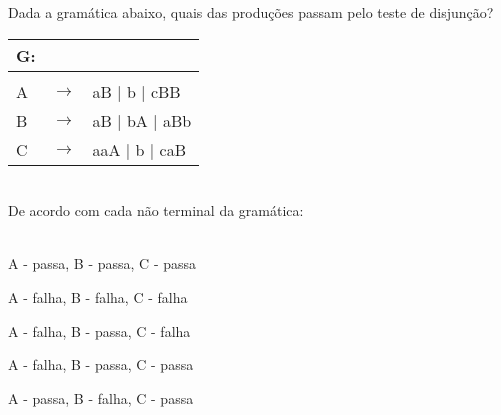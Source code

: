 \question[10] 

Dada a gramática abaixo, quais das produções passam pelo teste de disjunção?\\
\begin{tabular}{|l c l}
	G: & & \\
	\hline \\
	A & $\rightarrow$ & aB | b | cBB \\
    B & $\rightarrow$ & aB | bA | aBb \\
	C & $\rightarrow$ & aaA | b | caB \\
\end{tabular}
\\
De acordo com cada não terminal da gramática:\\
\\
\begin{choices}
\item A - passa, B - passa, C - passa
\item A - falha, B - falha, C - falha
\item A - falha, B - passa, C - falha
\item A - falha, B - passa, C - passa
\item A - passa, B - falha, C - passa %
\end{choices}
\answerline

